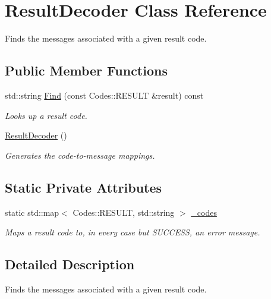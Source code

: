 \hypertarget{classResultDecoder}{
\section{ResultDecoder Class Reference}
\label{classResultDecoder}
}


Finds the messages associated with a given result code.  


\subsection*{Public Member Functions}
\begin{DoxyCompactItemize}
\item 
std::string \hyperlink{classResultDecoder_ace7c2719b4f9de2a5e25fccfddc6d8f4}{Find} (const Codes::RESULT \&result) const 
\begin{DoxyCompactList}\small\item\em Looks up a result code. \item\end{DoxyCompactList}\item 
\hypertarget{classResultDecoder_afafd3458bdbcbd7b1b95545f47151358}{
\hyperlink{classResultDecoder_afafd3458bdbcbd7b1b95545f47151358}{ResultDecoder} ()}
\label{classResultDecoder_afafd3458bdbcbd7b1b95545f47151358}

\begin{DoxyCompactList}\small\item\em Generates the code-\/to-\/message mappings. \item\end{DoxyCompactList}\end{DoxyCompactItemize}
\subsection*{Static Private Attributes}
\begin{DoxyCompactItemize}
\item 
static std::map$<$ Codes::RESULT, std::string $>$ \hyperlink{classResultDecoder_ab19497e41c5d1a0546ed33642cad48dd}{\_\-codes}
\begin{DoxyCompactList}\small\item\em Maps a result code to, in every case but SUCCESS, an error message. \item\end{DoxyCompactList}\end{DoxyCompactItemize}


\subsection{Detailed Description}
Finds the messages associated with a given result code. 

